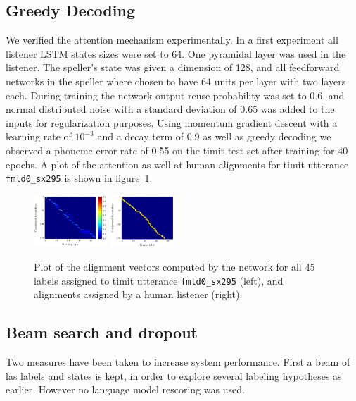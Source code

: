 \documentclass{article}
\begin{document}
\subsection{Greedy Decoding}
We verified the attention mechanism experimentally. In a first experiment all listener LSTM states sizes were set to 64. One pyramidal layer was used in the listener. The speller's state was given a dimension of 128, and all feedforward networks in the speller where chosen to have 64 units per layer with two layers each. During training the network output reuse probability was set to $0.6$, and normal distributed noise with a standard deviation of 0.65 was added to the inputs for regularization purposes. Using momentum gradient descent with a learning rate of $10^{-3}$ and a decay term of $0.9$ as well as greedy decoding we observed a phoneme error rate of 0.55 on the timit test set after training for 40 epochs.
A plot of the attention as well at human alignments for timit utterance \texttt{fmld0\_sx295} is shown in figure~\ref{fig:fullAttention}.

\begin{figure}
\centering
\includegraphics[width=0.245\textwidth]{../tikz/alpha.pdf}
\includegraphics[width=0.21\textwidth]{../tikz/align.pdf}
\caption{Plot of the alignment vectors computed by the network for all 45 labels assigned to timit utterance \texttt{fmld0\_sx295} (left), and alignments assigned by a human listener (right).}
\label{fig:fullAttention}
\end{figure}

\subsection{Beam search and dropout}
Two measures have been taken to increase system performance. First a beam of las labels and states is kept, in order to explore several labeling hypotheses as earlier. However no language model rescoring was used.
\end{document}
